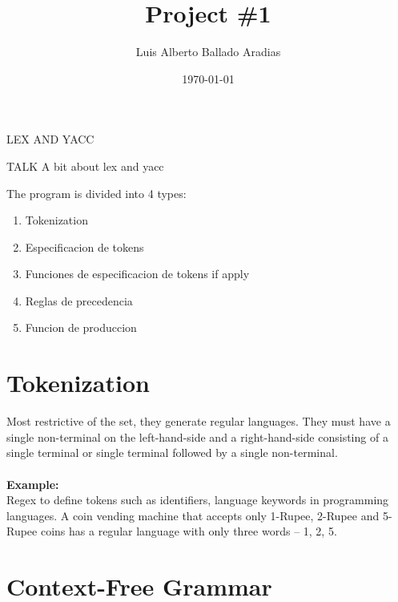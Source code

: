 \documentclass[
	12pt, %
]{fphw}
\title{Project \#1} %
\author{Luis Alberto Ballado Aradias} %
\date{\today} %
\institute{Centro de Investigación y de Estudios Avanzados del IPN \\ Unidad Tamaulipas} %
\begin{document}
\maketitle %

{\color{teal}
\dotfill
LEX AND YACC
\dotfill}

TALK A bit about lex and yacc


\newpage
The program is divided into 4 types:
\begin{enumerate}
\item Tokenization
\item Especificacion de tokens
\item Funciones de especificacion de tokens if apply  
\item Reglas de precedencia
\item Funcion de produccion
\end{enumerate}

\section*{{\color{BlueViolet}Tokenization}}

Most restrictive of the set, they generate regular languages. They must have a single non-terminal on the left-hand-side and a right-hand-side consisting of a single terminal or single terminal followed by a single non-terminal.\\\\

\textbf{Example:}\\

Regex to define tokens such as identifiers, language keywords in programming languages. A coin vending machine that accepts only 1-Rupee, 2-Rupee and 5-Rupee coins has a regular language with only three words – 1, 2, 5.


\section*{{\color{Apricot}Context-Free Grammar}}
\end{document}
